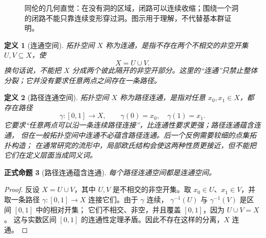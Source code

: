 \documentclass[UTF8,fontset=none,a4paper,11pt]{ctexart}
\theoremstyle{foundation-definition}
\newtheorem{definition}{定义}[section]
\theoremstyle{foundation-theorem}
\theoremstyle{foundation-proposition}
\newtheorem{proposition}[definition]{正式命题}
\theoremstyle{foundation-example}
\theoremstyle{foundation-remark}
\theoremstyle{foundation-theorem}
\begin{document}
\begin{figure}[htbp]
\centering
{}
\caption{同伦的几何直觉：在没有洞的区域，闭路可以连续收缩；围绕一个洞的闭路不能只靠连续变形穿过洞。图示用于理解，不代替基本群证明。}
\label{fig:homotopy-contraction}
\end{figure}

\begin{definition}[连通空间]\label{def:connected}
拓扑空间 \(X\) 称为连通，是指不存在两个不相交的非空开集 \(U,V\subseteq X\)，使
\[
X=U\cup V.
\]
换句话说，不能把 \(X\) 分成两个彼此隔开的非空开部分。这里的“连通”只禁止整体分裂；它并没有要求任意两点之间存在一条路径。
\end{definition}

\begin{definition}[路径连通空间]\label{def:path-connected}
拓扑空间 \(X\) 称为路径连通，是指对任意 \(x_0,x_1\in X\)，都存在路径
\[
\gamma:[0,1]\to X,
\qquad \gamma(0)=x_0,\quad\gamma(1)=x_1.
\]
它要求“任意两点可以沿一条连续路径连接”，比连通性要求更强；路径连通蕴含连通，
但在一般拓扑空间中连通不必蕴含路径连通。后一个反例需要较细的点集拓扑构造；
在通常研究的流形中，局部欧氏结构会使这两种性质更接近，但不能把它们在定义层面当成同义词。
\end{definition}

\begin{proposition}[路径连通蕴含连通]\label{prop:path-connected-connected}
每个路径连通空间都是连通空间。
\end{proposition}

\begin{proof}
反设 \(X=U\cup V\)，其中 \(U,V\) 是不相交的非空开集。取
\(x_0\in U\)、\(x_1\in V\)，并取一条路径
\(\gamma:[0,1]\to X\) 连接它们。由于 \(\gamma\) 连续，
\(\gamma^{-1}(U)\) 与 \(\gamma^{-1}(V)\) 是区间 \([0,1]\) 中的相对开集；
它们不相交、非空，并且覆盖 \([0,1]\)，因为 \(U\cup V=X\)。
这与实数区间 \([0,1]\) 的连通性定理矛盾。因此不存在这样的分离，\(X\) 连通。
\end{proof}
\end{document}
